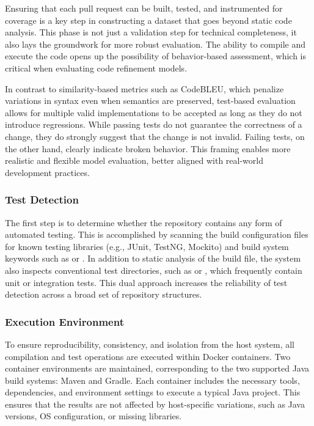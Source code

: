 Ensuring that each pull request can be built, tested, and instrumented for coverage is a key step in
constructing a dataset that goes beyond static code analysis. This phase is not just a validation
step for technical completeness, it also lays the groundwork for more robust evaluation. The ability
to compile and execute the code opens up the possibility of behavior-based assessment, which is
critical when evaluating code refinement models.

In contrast to similarity-based metrics such as CodeBLEU, which penalize variations in syntax even
when semantics are preserved, test-based evaluation allows for multiple valid implementations to be
accepted as long as they do not introduce regressions. While passing tests do not guarantee the
correctness of a change, they do strongly suggest that the change is not invalid. Failing tests, on
the other hand, clearly indicate broken behavior. This framing enables more realistic and flexible
model evaluation, better aligned with real-world development practices.

\subsubsection{Test Detection}

The first step is to determine whether the repository contains any form of automated
testing. This is accomplished by scanning the build configuration files for known testing libraries
(e.g., JUnit, TestNG, Mockito) and build system keywords such as  or
. In addition to static analysis of the build file, the system also
inspects conventional test directories, such as  or , which
frequently contain unit or integration tests. This dual approach increases the reliability of test
detection across a broad set of repository structures.

\subsubsection{Execution Environment}

To ensure reproducibility, consistency, and isolation from the host system, all compilation and test
operations are executed within Docker containers. Two container environments are maintained,
corresponding to the two supported Java build systems: Maven and Gradle. Each container includes the
necessary tools, dependencies, and environment settings to execute a typical Java project. This
ensures that the results are not affected by host-specific variations, such as Java versions, OS
configuration, or missing libraries.

